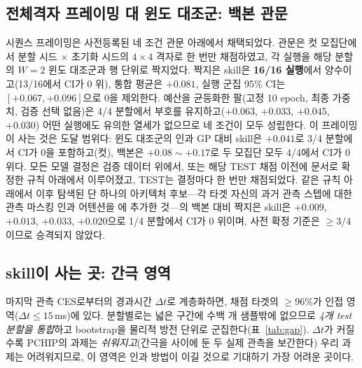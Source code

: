 \documentclass[10pt,a4paper]{article}
\begin{document}
\subsection{전체격자 프레이밍 대 윈도 대조군: 백본 관문}
\label{sec:gate}
시퀀스 프레이밍은 사전등록된 네 조건 관문 아래에서 채택되었다. 관문은 컷 모집단에서
분할 시드 $\times$ 초기화 시드의 $4\times 4$ 격자로 한 번만 채점하였고, 각 실행을 해당
분할의 $W{=}2$ 윈도 대조군과 행 단위로 짝지었다. 짝지은 \Ti{} skill은 \textbf{16/16
실행}에서 양수이고(13/16에서 CI가 0 위), 통합 평균은 $\mathbf{+0.081}$, 실행 군집 95\%
CI는 $[+0.067, +0.096]$으로 0을 제외한다. 예산을 균등화한 팔(고정 10 epoch, 최종
가중치, 검증 선택 없음)은 4/4 분할에서 부호를 유지하고($+0.063$, $+0.033$, $+0.045$,
$+0.030$) 어떤 실행에도 유의한 \Vrot{} 열세가 없으므로 네 조건이 모두 성립한다. 이
프레이밍이 사는 것은 도달 범위다: 윈도 대조군의 인과 GP 대비 skill은 $+0.041$로 3/4
분할에서 CI가 0을 포함하고(컷), 백본은 $+0.08\sim+0.17$로 두 모집단 모두 4/4에서 CI가
0 위다. 모든 모델 결정은 검증 데이터 위에서, 또는 해당 TEST 채점 이전에 문서로 확정한
규칙 아래에서 이루어졌고, TEST는 결정마다 한 번만 채점되었다. 같은 규칙 아래에서
이후 탐색된 단 하나의 아키텍처 후보---각 타겟 자신의 과거 관측 스텝에 대한 관측
마스킹 인과 어텐션을 \seqv{}에 추가한 것---의 백본 대비 짝지은 \Ti{} skill은
$+0.009$, $+0.013$, $+0.033$, $+0.020$으로 1/4 분할에서 CI가 0 위이며, 사전 확정
기준은 $\geq 3/4$이므로 승격되지 않았다.

\subsection{skill이 사는 곳: 간극 영역}
\label{sec:gap}
마지막 관측 CES로부터의 경과시간 $\Delta t$로 계층화하면, 채점 타겟의
$\geq$96\%가 인접 영역($\Delta t \leq 15$\,ms)에 있다. 분할별로는 넓은 구간에
수백 개 샘플밖에 없으므로 \emph{4개 test 분할을 통합}하고 bootstrap을 물리적
방전 단위로 군집한다(표~\ref{tab:gap}). $\Delta t$가 커질수록 PCHIP의 과제는
\emph{쉬워지고}(간극을 사이에 둔 두 실제 관측을 보간한다) 우리 과제는 어려워지므로,
이 영역은 인과 방법이 이길 것으로 기대하기 가장 어려운 곳이다.
\end{document}
